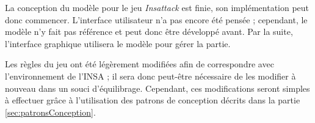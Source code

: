 La conception du modèle pour le jeu \emph{Insattack} est finie, son implémentation peut donc commencer.
L'interface utilisateur n'a pas encore été pensée ; cependant, le modèle n'y fait pas référence et peut donc être développé avant.
Par la suite, l'interface graphique utilisera le modèle pour gérer la partie.

Les règles du jeu ont été légèrement modifiées afin de correspondre avec l'environnement de l'INSA ; il sera donc peut-être nécessaire de les modifier à nouveau dans un souci d'équilibrage.
Cependant, ces modifications seront simples à effectuer grâce à l'utilisation des patrons de  conception décrits dans la partie \ref{sec:patronsConception}.